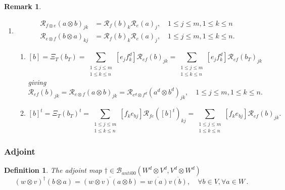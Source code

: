 \documentclass[aps,preprint]{revtex4}%
\newtheorem{definition}[theorem]{Definition}
\newtheorem{remark}[theorem]{Remark}
\begin{document}
\begin{remark}
\begin{enumerate}
\item
\begin{align}
\mathcal{R}_{f\otimes e}\left(  a\otimes b\right)  _{jk}  &  =\mathcal{R}%
_{f}\left(  b\right)  _{k}\mathcal{R}_{e}\left(  a\right)  _{j},\quad1\leq
j\leq m,1\leq k\leq n\\
\mathcal{R}_{e\otimes f}\left(  b\otimes a\right)  _{kj}  &  =\mathcal{R}%
_{f}\left(  b\right)  _{k}\mathcal{R}_{e}\left(  a\right)  _{j},\quad1\leq
j\leq m,1\leq k\leq n.
\end{align}


\begin{enumerate}
\item
\begin{equation}
\left[  b\right]  =\Xi_{T}\left(  b_{T}\right)  =\sum_{\substack{1\leq j\leq
m\\1\leq k\leq n}}\left[  e_{j}f_{k}^{d}\right]  \mathcal{R}_{ef}\left(
b\right)  _{jk}=\sum_{\substack{1\leq j\leq m\\1\leq k\leq n}}\left[
e_{j}f_{k}^{d}\right]  \mathcal{R}_{ef}\left(  b_{T}\right)  _{jk}%
\end{equation}
giving%
\begin{equation}
\mathcal{R}_{ef}\left(  b\right)  _{jk}=\mathcal{R}_{e\otimes f}\left(
a\otimes b\right)  _{jk}=\mathcal{R}_{e^{d}\otimes f^{d}}\left(  a^{d}\otimes
b^{d}\right)  _{jk},\quad1\leq j\leq m,1\leq k\leq n.
\end{equation}


\item
\begin{equation}
\left[  b\right]  ^{t}=\Xi_{T}\left(  b_{T}\right)  ^{t}=\sum_{\substack{1\leq
j\leq m\\1\leq k\leq n}}\left[  f_{k}e_{bj}\right]  \mathcal{R}_{fe}\left(
\left[  b\right]  ^{t}\right)  _{kj}=\sum_{\substack{1\leq j\leq m\\1\leq
k\leq n}}\left[  f_{k}e_{bj}\right]  \mathcal{R}_{ef}\left(  b\right)  _{jk}.
\end{equation}

\end{enumerate}
\end{enumerate}
\end{remark}

\subsubsection{Adjoint}

\begin{definition}
The adjoint map $\dagger\in\mathcal{B}_{anti00}\left(  W^{d}\otimes
V^{d},V^{d}\otimes W^{d}\right)  $%
\begin{equation}
\left(  w\otimes v\right)  ^{\dagger}\left(  b\otimes a\right)  =\overline
{\left(  w\otimes v\right)  \left(  a\otimes b\right)  }=\overline{w\left(
a\right)  }\overline{v\left(  b\right)  },\quad\forall b\in V,\forall a\in
W\,.
\end{equation}

\end{definition}
\end{document}

